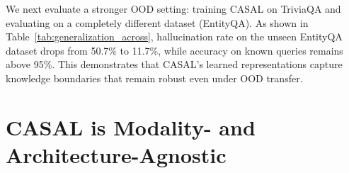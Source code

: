 \begin{table}[htbp]
\centering
\small
{}
\caption[CASAL generalizes across datasets (TriviaQA to EntityQA)]{CASAL supports OOD generalization across datasets. The model is trained on TriviaQA and tested on EntityQA as an out-of-distribution setting. Hallucination rate drops from 50.7\% to 11.7\% on the unseen dataset.}
\label{tab:generalization_across}
\end{table}

We next evaluate a stronger OOD setting: training CASAL on TriviaQA and evaluating on a completely different dataset (EntityQA). As shown in Table~\ref{tab:generalization_across}, hallucination rate on the unseen EntityQA dataset drops from 50.7\% to 11.7\%, while accuracy on known queries remains above 95\%. This demonstrates that CASAL's learned representations capture knowledge boundaries that remain robust even under OOD transfer.

\section{CASAL is Modality- and Architecture-Agnostic}

